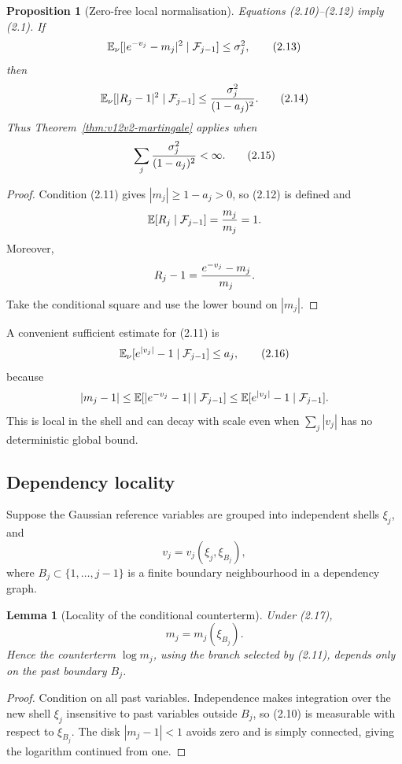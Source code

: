 \documentclass[11pt]{article}
\newtheorem{proposition}[theorem]{Proposition}
\newtheorem{lemma}[theorem]{Lemma}
\theoremstyle{remark}
\begin{document}
\begin{proposition}[Zero-free local normalisation]
\label{prop:v12v2-local}
Equations (2.10)--(2.12) imply (2.1).  If
\[
 \mathbb E_\nu[
 |e^{-v_j}-m_j|^2\mid{\cal F}_{j-1}]
                              \le\sigma_j^2,                 \tag{2.13}
\]
then
\[
 \mathbb E_\nu[
 |R_j-1|^2\mid{\cal F}_{j-1}]
                              \le{\sigma_j^2\over(1-a_j)^2}. \tag{2.14}
\]
Thus Theorem~\ref{thm:v12v2-martingale} applies when
\[
                              \sum_j{\sigma_j^2\over(1-a_j)^2}
                              <\infty.                        \tag{2.15}
\]
\end{proposition}

\begin{proof}
Condition (2.11) gives \(|m_j|\ge1-a_j>0\), so (2.12) is defined and
\[
 \mathbb E[R_j\mid{\cal F}_{j-1}]
 ={m_j\over m_j}=1.
\]
Moreover,
\[
 R_j-1={e^{-v_j}-m_j\over m_j}.
\]
Take the conditional square and use the lower bound on \(|m_j|\).
\end{proof}

A convenient sufficient estimate for (2.11) is
\[
 \mathbb E_\nu[e^{|v_j|}-1\mid{\cal F}_{j-1}]\le a_j,        \tag{2.16}
\]
because
\[
 |m_j-1|
 \le\mathbb E[|e^{-v_j}-1|\mid{\cal F}_{j-1}]
 \le\mathbb E[e^{|v_j|}-1\mid{\cal F}_{j-1}].
\]
This is local in the shell and can decay with scale even when
\(\sum_j|v_j|\) has no deterministic global bound.

\subsection{Dependency locality}

Suppose the Gaussian reference variables are grouped into independent
shells \(\xi_j\), and
\[
                              v_j=v_j(\xi_j,\xi_{B_j}),       \tag{2.17}
\]
where \(B_j\subset\{1,\ldots,j-1\}\) is a finite boundary
neighbourhood in a dependency graph.

\begin{lemma}[Locality of the conditional counterterm]
\label{lem:v12v2-locality}
Under (2.17),
\[
                              m_j=m_j(\xi_{B_j}).             \tag{2.18}
\]
Hence the counterterm \(\log m_j\), using the branch selected by
(2.11), depends only on the past boundary \(B_j\).
\end{lemma}

\begin{proof}
Condition on all past variables.  Independence makes integration over
the new shell \(\xi_j\) insensitive to past variables outside \(B_j\),
so (2.10) is measurable with respect to \(\xi_{B_j}\).
The disk \(|m_j-1|<1\) avoids zero and is simply connected, giving the
logarithm continued from one.
\end{proof}
\end{document}
